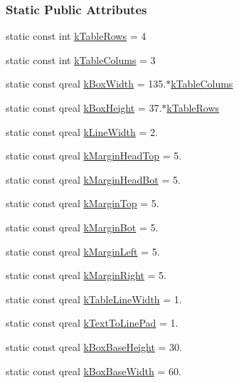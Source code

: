 \subsubsection*{Static Public Attributes}
\begin{DoxyCompactItemize}
\item 
static const int \hyperlink{class_info_line_a95cdc7a95cde6db7c6faceda995d26b9}{k\+Table\+Rows} = 4
\item 
static const int \hyperlink{class_info_line_a9fc071b08eb913cf3afc623835ad2fd8}{k\+Table\+Colums} = 3
\item 
static const qreal \hyperlink{class_info_line_af71f2b91ea77398bd770b973b71e2896}{k\+Box\+Width} = 135.$\ast$\hyperlink{class_info_line_a9fc071b08eb913cf3afc623835ad2fd8}{k\+Table\+Colums}
\item 
static const qreal \hyperlink{class_info_line_a279cafcac8d844a00bd27dde524102dd}{k\+Box\+Height} = 37.$\ast$\hyperlink{class_info_line_a95cdc7a95cde6db7c6faceda995d26b9}{k\+Table\+Rows}
\item 
static const qreal \hyperlink{class_info_line_a18390d54c56cd68cf6e767a5df7404d8}{k\+Line\+Width} = 2.
\item 
static const qreal \hyperlink{class_info_line_aa08e22c99ce13c2fc57a9d9c9de4d99f}{k\+Margin\+Head\+Top} = 5.
\item 
static const qreal \hyperlink{class_info_line_a3d981c2b5f55052aad8d105177be443d}{k\+Margin\+Head\+Bot} = 5.
\item 
static const qreal \hyperlink{class_info_line_ab0b7394c3710ba9d88da13a484069302}{k\+Margin\+Top} = 5.
\item 
static const qreal \hyperlink{class_info_line_a82acf816389449ddce739e8abb6e0fdc}{k\+Margin\+Bot} = 5.
\item 
static const qreal \hyperlink{class_info_line_a480271b6a9d683ab36c0c6ef142a461f}{k\+Margin\+Left} = 5.
\item 
static const qreal \hyperlink{class_info_line_af945da2dfe0437816b9e1fe8e6668692}{k\+Margin\+Right} = 5.
\item 
static const qreal \hyperlink{class_info_line_a9d03a53c9bca9357e502a1e423ff4541}{k\+Table\+Line\+Width} = 1.
\item 
static const qreal \hyperlink{class_info_line_a858d0872a7e51d40ff6c87af5736db54}{k\+Text\+To\+Line\+Pad} = 1.
\item 
static const qreal \hyperlink{class_info_line_ab332e0b1c83e5ab8f551e3f39b2dfc55}{k\+Box\+Base\+Height} = 30.
\item 
static const qreal \hyperlink{class_info_line_a53e6553a87f670410cf66ed735f91550}{k\+Box\+Base\+Width} = 60.
\end{DoxyCompactItemize}
